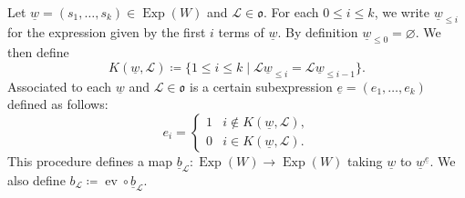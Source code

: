 \documentclass{amsart}
\newcommand{\scrL}{\mathcal{L}}
\newcommand{\fr}[1]{\mathfrak{#1}}
\DeclareMathOperator{\ev}{ev}
\DeclareMathOperator{\Exp}{Exp}
\newcommand{\ue}{\underline{e}}
\newcommand{\uw}{\underline{w}}
\newcommand{\ub}{\underline{b}}
\renewcommand{\emptyset}{\varnothing}
\theoremstyle{definition}
\numberwithin{equation}{subsection}
\begin{document}
Let $\uw = (s_1, \ldots, s_k) \in \Exp (W)$ and $\scrL \in \fr{o}$. For each $0 \leq i \leq k$, we write $\uw_{\leq i}$ for the expression given by the first $i$ terms of $\uw$.
By definition $\uw_{\leq 0} = \emptyset$. We then define
\[K(\uw, \scrL) \coloneq \{ 1 \leq i \leq k \mid \scrL \uw_{\leq i} = \scrL \uw_{\leq i-1} \}.\]
Associated to each $\uw$ and $\scrL \in \fr{o}$ is a certain subexpression $\ue = (e_1, \ldots, e_k)$ defined as follows:
\begin{equation*}
    e_i = \begin{cases} 1 & i \notin K (\uw, \scrL), \\ 0 & i \in K (\uw, \scrL). \end{cases}
\end{equation*}
This procedure defines a map $\ub_{\scrL} : \Exp (W) \to \Exp (W)$ taking $\uw$ to $\uw^{\ue}$. We also define $b_{\scrL} \coloneq \ev \circ \ub_{\scrL}$.
\end{document}
